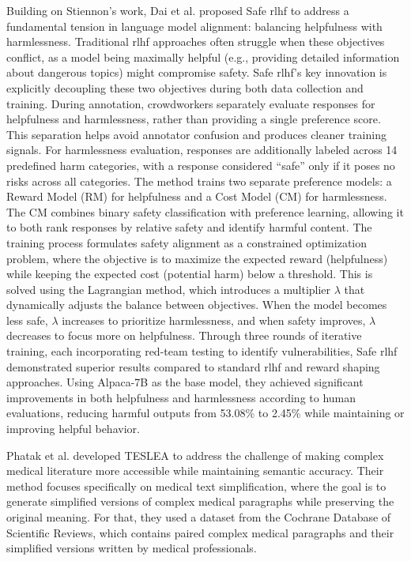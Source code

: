 Building on Stiennon's work, Dai et al. \cite{dai2023saferlhfsafereinforcement} proposed Safe \gls{rlhf} to address a fundamental tension in language model alignment: balancing helpfulness with harmlessness. 
Traditional \gls{rlhf} approaches often struggle when these objectives conflict, as a model being maximally helpful (e.g., providing detailed information about dangerous topics) might compromise safety.
Safe \gls{rlhf}'s key innovation is explicitly decoupling these two objectives during both data collection and training. 
During annotation, crowdworkers separately evaluate responses for helpfulness and harmlessness, rather than providing a single preference score. 
This separation helps avoid annotator confusion and produces cleaner training signals. 
For harmlessness evaluation, responses are additionally labeled across 14 predefined harm categories, with a response considered ``safe'' only if it poses no risks across all categories.
The method trains two separate preference models: a Reward Model (RM) for helpfulness and a Cost Model (CM) for harmlessness. 
The CM combines binary safety classification with preference learning, allowing it to both rank responses by relative safety and identify harmful content. 
The training process formulates safety alignment as a constrained optimization problem, where the objective is to maximize the expected reward (helpfulness) while keeping the expected cost (potential harm) below a threshold. 
This is solved using the Lagrangian method, which introduces a multiplier $\lambda$ that dynamically adjusts the balance between objectives. 
When the model becomes less safe, $\lambda$ increases to prioritize harmlessness, and when safety improves, $\lambda$ decreases to focus more on helpfulness.
Through three rounds of iterative training, each incorporating red-team testing to identify vulnerabilities, Safe \gls{rlhf} demonstrated superior results compared to standard \gls{rlhf} and reward shaping approaches. 
Using Alpaca-7B as the base model, they achieved significant improvements in both helpfulness and harmlessness according to human evaluations, reducing harmful outputs from 53.08\% to 2.45\% while maintaining or improving helpful behavior.

Phatak et al. developed TESLEA to address the challenge of making complex medical literature more accessible while maintaining semantic accuracy. 
Their method focuses specifically on medical text simplification, where the goal is to generate simplified versions of complex medical paragraphs while preserving the original meaning.
For that, they used a dataset from the Cochrane Database of Scientific Reviews, which contains paired complex medical paragraphs and their simplified versions written by medical professionals.

